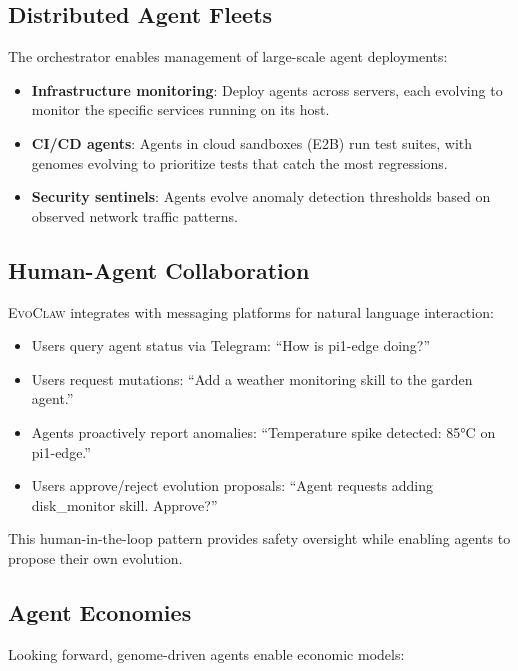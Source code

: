 \documentclass{article}
\newcommand{\evoclaw}{\textsc{EvoClaw}}
\begin{document}
\subsection{Distributed Agent Fleets}

The orchestrator enables management of large-scale agent deployments:

\begin{itemize}[leftmargin=*]
    \item \textbf{Infrastructure monitoring}: Deploy agents across servers, each evolving to monitor the specific services running on its host.
    \item \textbf{CI/CD agents}: Agents in cloud sandboxes (E2B) run test suites, with genomes evolving to prioritize tests that catch the most regressions.
    \item \textbf{Security sentinels}: Agents evolve anomaly detection thresholds based on observed network traffic patterns.
\end{itemize}


\subsection{Human-Agent Collaboration}

\evoclaw{} integrates with messaging platforms for natural language interaction:

\begin{itemize}[leftmargin=*]
    \item Users query agent status via Telegram: ``How is pi1-edge doing?''
    \item Users request mutations: ``Add a weather monitoring skill to the garden agent.''
    \item Agents proactively report anomalies: ``Temperature spike detected: 85°C on pi1-edge.''
    \item Users approve/reject evolution proposals: ``Agent requests adding disk\_monitor skill. Approve?''
\end{itemize}

This human-in-the-loop pattern provides safety oversight while enabling agents to propose their own evolution.


\subsection{Agent Economies}

Looking forward, genome-driven agents enable economic models:
\end{document}

